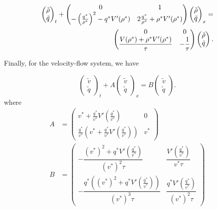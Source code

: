\documentclass[5p,twocolumn]{elsarticle}
\begin{document}
{
\footnotesize
\begin{align} \label{rhoqlin}
\begin{pmatrix}
\tilde{\rho} \\ \tilde{q}
\end{pmatrix}_t
+ \begin{pmatrix}
0 & 1 \\
- \left(\frac{q^*}{\rho^*}\right)^2 - q^* V'(\rho^*) & 2\frac{q^*}{\rho^*} + \rho^* V'(\rho^*)
\end{pmatrix}
\begin{pmatrix}
\tilde{\rho} \\ \tilde{q}
\end{pmatrix}_x = &\\
\begin{pmatrix}
0 & 0 \\
\dfrac{V(\rho^*)+\rho^*V'( \rho^*)}{\tau} & -\dfrac{1}{\tau}
\end{pmatrix}
\begin{pmatrix}
\tilde{\rho} \\ \tilde{q}
\end{pmatrix}. \notag
\end{align}
}

Finally, for the velocity-flow system, we have

{
\footnotesize
\begin{equation} \label{vqlin}
\begin{pmatrix}
\tilde{v} \\ \tilde{q}
\end{pmatrix}_t
+ 
A
\begin{pmatrix}
\tilde{v} \\ \tilde{q}
\end{pmatrix}_x 
= 
B
\begin{pmatrix}
\tilde{v} \\ \tilde{q}
\end{pmatrix}.
\end{equation}
}
where
{\footnotesize
\begin{align}
A &= 
\begin{pmatrix}
	v^* + \frac{q^*}{v^*} V'\left(\frac{q^*}{v^*}\right) & 0 \\
	\frac{q^*}{v^*} \left( v^* + \frac{q^*}{v^*} V'\left(\frac{q^*}{v^*}\right)\right) & v^*
\end{pmatrix} \\
B &= 
\begin{pmatrix}
		-\dfrac{(v^*)^2+q^*V'\left(\frac{q^*}{v^*}\right)}{(v^*)^2 \tau} & 				\dfrac{V'\left(\frac{q^*}{v^*}\right)}{v^* \tau} \\
		-\dfrac{q^*\left((v^*)^2 + q^*V'\left(\frac{q^*}{v^*}\right)\right)}{(v^*)^3 \tau}  & \dfrac{q^*V'\left(\frac{q^*}{v^*}\right)}{(v^*)^2 \tau}
\end{pmatrix}
\end{align}
}
\end{document}
